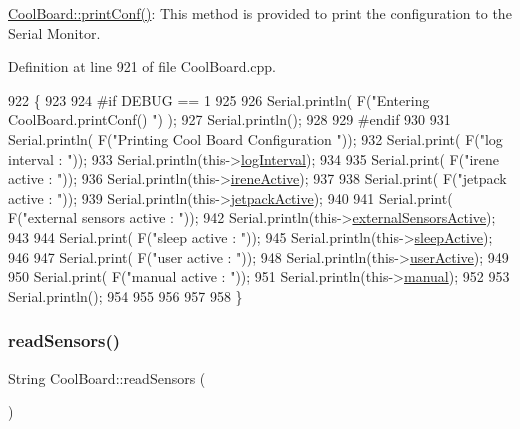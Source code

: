\hyperlink{class_cool_board_a486507b8f0981d3cc671ed31c2145755}{Cool\+Board\+::print\+Conf()}\+: This method is provided to print the configuration to the Serial Monitor. 

Definition at line 921 of file Cool\+Board.\+cpp.


\begin{DoxyCode}
922 \{
923 
924 \textcolor{preprocessor}{#if DEBUG == 1}
925     
926     Serial.println( F(\textcolor{stringliteral}{"Entering CoolBoard.printConf() "}) );
927     Serial.println();
928 
929 \textcolor{preprocessor}{#endif}
930 
931     Serial.println( F(\textcolor{stringliteral}{"Printing Cool Board Configuration "}));
932     Serial.print( F(\textcolor{stringliteral}{"log interval       : "}));
933     Serial.println(this->\hyperlink{class_cool_board_a84bc94413b64973e4aba8c467c97006c}{logInterval});
934 
935     Serial.print( F(\textcolor{stringliteral}{"irene active       : "}));
936     Serial.println(this->\hyperlink{class_cool_board_a9c3f7ac625481ee2ae802a25d97a4ae0}{ireneActive});
937 
938     Serial.print( F(\textcolor{stringliteral}{"jetpack active     : "}));
939     Serial.println(this->\hyperlink{class_cool_board_a9be03a913d26e558328935ca3b59a75e}{jetpackActive});
940 
941     Serial.print( F(\textcolor{stringliteral}{"external sensors active    : "}));
942     Serial.println(this->\hyperlink{class_cool_board_a638b00b76aeb819ecfd4c10b8cdd7bb7}{externalSensorsActive});
943 
944     Serial.print( F(\textcolor{stringliteral}{"sleep active       : "}));
945     Serial.println(this->\hyperlink{class_cool_board_a0a51b2287139f66c738101fb53139230}{sleepActive});
946 
947     Serial.print( F(\textcolor{stringliteral}{"user active        : "}));
948     Serial.println(this->\hyperlink{class_cool_board_a6395459131d6889a3005f79c7a35e964}{userActive});
949 
950     Serial.print( F(\textcolor{stringliteral}{"manual active      : "}));
951     Serial.println(this->\hyperlink{class_cool_board_a7c8e505a5804b109e112d5a03df6ea2b}{manual});
952 
953     Serial.println();
954 
955 
956 
957 
958 \}
\end{DoxyCode}
\mbox{\label{class_cool_board_ad03abdce2e65f520bbf2cff0f2d083cf}} 
\subsubsection{\texorpdfstring{read\+Sensors()}{readSensors()}}
{\footnotesize\ttfamily String Cool\+Board\+::read\+Sensors (\begin{DoxyParamCaption}{ }\end{DoxyParamCaption})}

